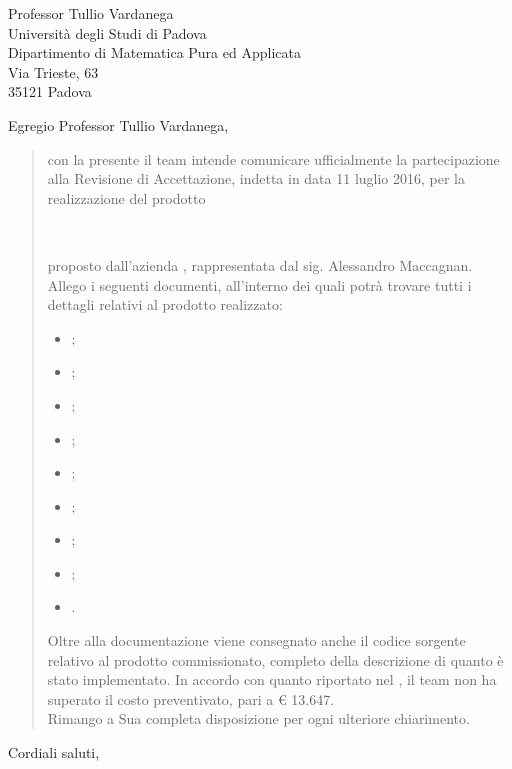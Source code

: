 \date{Padova, 11 Luglio 2016}
\begin{letter}{
	Professor Tullio Vardanega \\
	Università degli Studi di Padova \\
	Dipartimento di Matematica Pura ed Applicata \\
	Via Trieste, 63 \\
	35121 Padova
}
\signature{
\begin{center}
\textit{
\Responsabile{} \\
Responsabile \GroupName{}
}
\texttt{[image: res/MatteoDiPirro.png]}
\end{center}
}
\opening{Egregio Professor Tullio Vardanega,}
\begin{quotation}
con la presente il team \GroupName{} intende comunicare ufficialmente la partecipazione alla Revisione di Accettazione, indetta in data 11 luglio 2016, per la realizzazione del prodotto \\ 
\begin{center}
\textbf{\ProjectName{}} \\
\end{center} proposto dall'azienda \Proponente, rappresentata dal sig. Alessandro Maccagnan. \\
Allego i seguenti documenti, all'interno dei quali potrà trovare tutti i dettagli relativi al prodotto realizzato:
\begin{itemize}
\item \AnalisiDeiRequisiti{};
\item \Glossario{};
\item \NormeDiProgetto{};
\item \PianoDiProgetto{};
\item \PianoDiQualifica{};
\item \SpecificaTecnica{};
\item \ManualeUtente{};
\item \ManualeSviluppatore{};
\item \ManualeAdmin{}.
\end{itemize}
Oltre alla documentazione viene consegnato anche il codice sorgente relativo al prodotto commissionato, completo della descrizione di quanto è stato implementato.
In accordo con quanto riportato nel \PianoDiProgetto, il team non ha superato il costo preventivato, pari a \euro{} 13.647. \\
Rimango a Sua completa disposizione per ogni ulteriore chiarimento.
\end{quotation}
\closing{Cordiali saluti,}
\end{letter}
